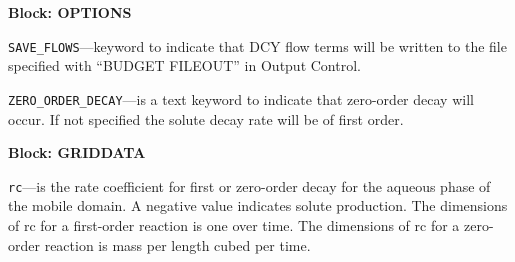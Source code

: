 
\item \textbf{Block: OPTIONS}

\begin{description}
\item \texttt{SAVE\_FLOWS}---keyword to indicate that DCY flow terms will be written to the file specified with ``BUDGET FILEOUT'' in Output Control.

\item \texttt{ZERO\_ORDER\_DECAY}---is a text keyword to indicate that zero-order decay will occur.  If not specified the solute decay rate will be of first order.

\end{description}
\item \textbf{Block: GRIDDATA}

\begin{description}
\item \texttt{rc}---is the rate coefficient for first or zero-order decay for the aqueous phase of the mobile domain.  A negative value indicates solute production.  The dimensions of rc for a first-order reaction is one over time.  The dimensions of rc for a zero-order reaction is mass per length cubed per time.

\end{description}

